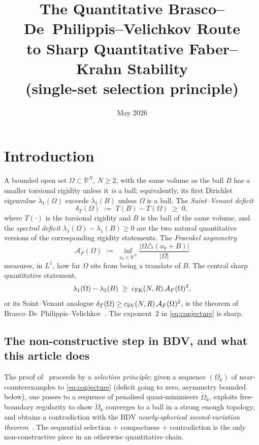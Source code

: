 \documentclass[11pt]{amsart}
\title{The Quantitative Brasco--De~Philippis--Velichkov Route\\
       to Sharp Quantitative Faber--Krahn Stability\\
       (single-set selection principle)}
\author{}
\date{May 2026}
\theoremstyle{definition}
\newcommand{\R}{\mathbb R}
\newcommand{\dT}{\delta_T}
\newcommand{\AF}{\mathcal A_F}
\begin{document}
\maketitle
\section{Introduction}\label{sec:intro}

A bounded open set $\Omega\subset\R^N$, $N\ge 2$, with the same volume
as the ball $B$ has a smaller torsional rigidity unless it \emph{is} a
ball; equivalently, its first Dirichlet eigenvalue $\lambda_1(\Omega)$
exceeds $\lambda_1(B)$ unless $\Omega$ is a ball.  The
\emph{Saint--Venant deficit}
\[
   \dT(\Omega)\;:=\;T(B)-T(\Omega)\;\ge\;0,
\]
where $T(\cdot)$ is the torsional rigidity and $B$ is the ball of the
same volume, and the \emph{spectral deficit}
$\lambda_1(\Omega)-\lambda_1(B)\ge 0$ are the two natural quantitative
versions of the corresponding rigidity statements.  The
\emph{Fraenkel asymmetry}
\[
   \AF(\Omega)\;:=\;\inf_{x_0\in\R^N}
   \frac{\bigl|\Omega\triangle(x_0+B)\bigr|}{|\Omega|}
\]
measures, in $L^1$, how far $\Omega$ sits from being a translate of
$B$.  The central sharp quantitative statement,
\begin{equation}\label{eq:conjecture}
   \lambda_1(\Omega)-\lambda_1(B)\;\ge\;c_{\rm FK}(N,R)\,\AF(\Omega)^{2},
\end{equation}
or its Saint--Venant analogue
$\dT(\Omega)\ge c_{\rm SV}(N,R)\,\AF(\Omega)^{2}$, is the theorem of
Brasco--De~Philippis--Velichkov~\cite{BDV2015}.  The exponent~$2$ in
\eqref{eq:conjecture} is sharp.

\subsection*{The non-constructive step in BDV, and what this article does}

The proof of~\cite{BDV2015} proceeds by a \emph{selection principle}:
given a sequence $(\Omega_k)$ of near-counterexamples to
\eqref{eq:conjecture} (deficit going to zero, asymmetry bounded
below), one passes to a sequence of penalised quasi-minimisers
$\widetilde\Omega_k$, exploits free-boundary regularity to show
$\widetilde\Omega_k$ converges to a ball in a strong enough topology,
and obtains a contradiction with the BDV \emph{nearly-spherical
second-variation theorem}~\cite[Theorem~3.3]{BDV2015}.  The
sequential selection $+$ compactness $+$ contradiction is the only
non-constructive piece in an otherwise quantitative chain.
\end{document}
